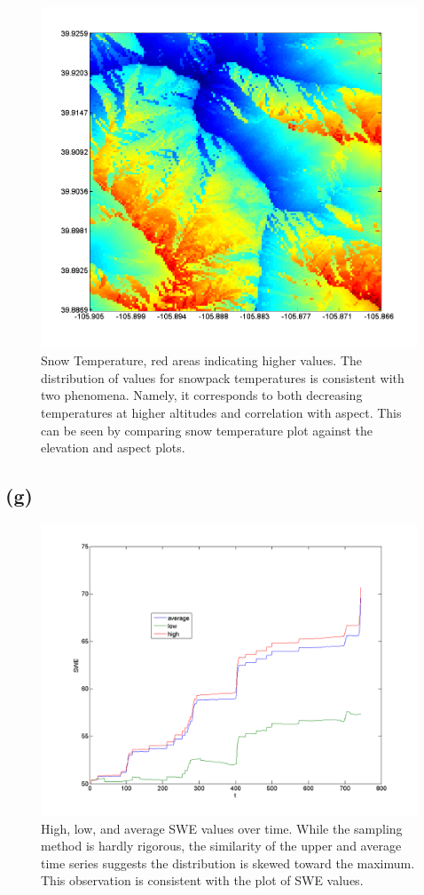 \documentclass[fleqn, letterpaper]{tufte-handout}
\begin{document}
\begin{figure}
	\includegraphics[width=\textwidth]{tsnow}
	\caption{Snow Temperature, red areas indicating higher values. The distribution of values for snowpack temperatures is consistent with two phenomena. Namely, it corresponds to both decreasing temperatures at higher altitudes and correlation with aspect. This can be seen by comparing snow temperature plot against the elevation and aspect plots.}
	\label{tsnow}
\end{figure}
\subsection{(g)}
\begin{figure}
	\includegraphics[width=\textwidth]{graph}
	\caption{High, low, and average SWE values over time. While the sampling method is hardly rigorous, the similarity of the upper and average time series suggests the distribution is skewed toward the maximum. This observation is consistent with the plot of SWE values.}
        \label{graph}
\end{figure}
\end{document}
